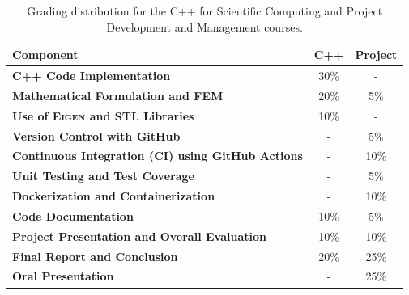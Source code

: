 \documentclass[english,10pt,a4paper]{article}
\begin{document}
\begin{table}[h!]
    \centering
    \begin{tabular}{lcc}
    \toprule
    \textbf{Component}                               & \textbf{C++} & \textbf{Project} \\ \midrule
    \textbf{C++ Code Implementation}                              & 30\%                                  & -                                           \\
    \textbf{Mathematical Formulation and FEM}                     & 20\%                                  & 5\%                                        \\
    \textbf{Use of \textsc{Eigen} and STL Libraries}              & 10\%                                  & -                                           \\
    \textbf{Version Control with GitHub}                          & -                                     & 5\%                                        \\
    \textbf{Continuous Integration (CI) using GitHub Actions}     & -                                     & 10\%                                        \\
    \textbf{Unit Testing and Test Coverage}                       & -                                     & 5\%                                        \\
    \textbf{Dockerization and Containerization}                   & -                                     & 10\%                                        \\
    \textbf{Code Documentation}                                   & 10\%                                  & 5\%                                        \\
    \textbf{Project Presentation and Overall Evaluation}          & 10\%                                  & 10\%                                        \\
    \textbf{Final Report and Conclusion}                          & 20\%                                  & 25\%                                        \\
    \textbf{Oral Presentation}                                    & -                                     & 25\%                                        \\
    \bottomrule
    \end{tabular}
    \caption{Grading distribution for the C++ for Scientific Computing and Project Development and Management courses.}
\end{table}
\end{document}
